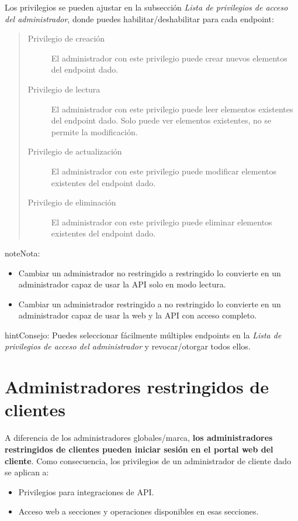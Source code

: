 \documentclass[letterpaper,10pt,spanish]{sphinxmanual}
\begin{document}
Los privilegios se pueden ajustar en la subsección \emph{Lista de privilegios de acceso del administrador}, donde puedes habilitar/deshabilitar para cada endpoint:
\begin{quote}
\begin{description}
\item[{Privilegio de creación}] \leavevmode
El administrador con este privilegio puede crear nuevos elementos del endpoint dado.

\item[{Privilegio de lectura}] \leavevmode
El administrador con este privilegio puede leer elementos existentes del endpoint dado. Solo puede ver elementos existentes, no se permite la modificación.

\item[{Privilegio de actualización}] \leavevmode
El administrador con este privilegio puede modificar elementos existentes del endpoint dado.

\item[{Privilegio de eliminación}] \leavevmode
El administrador con este privilegio puede eliminar elementos existentes del endpoint dado.

\end{description}
\end{quote}

\begin{notice}{note}{Nota:}\begin{itemize}
\item {} 
Cambiar un administrador no restringido a restringido lo convierte en un administrador capaz de usar la API solo en modo lectura.

\item {} 
Cambiar un administrador restringido a no restringido lo convierte en un administrador capaz de usar la web y la API con acceso completo.

\end{itemize}
\end{notice}

\begin{notice}{hint}{Consejo:}
Puedes seleccionar fácilmente múltiples endpoints en la \emph{Lista de privilegios de acceso del administrador} y revocar/otorgar todos ellos.
\end{notice}


\section{Administradores restringidos de clientes}
\label{api_rest/acls:client-restricted-administrators}
A diferencia de los administradores globales/marca, \textbf{los administradores restringidos de clientes pueden iniciar sesión en el portal web del cliente}. Como consecuencia, los privilegios de un administrador de cliente dado se aplican a:
\begin{itemize}
\item {} 
Privilegios para integraciones de API.

\item {} 
Acceso web a secciones y operaciones disponibles en esas secciones.

\end{itemize}
\end{document}
